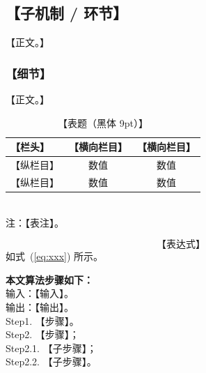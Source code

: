 \documentclass[twocolumn,10pt]{ctexart}
\let\songti\songfamily
\let\heiti\heifamily
\begin{document}
\subsection{\heiti\fontsize{10.5}{14}\selectfont 【子机制 / 环节】}
【正文。】

\subsubsection{\songti\fontsize{10}{13}\selectfont 【细节】}
【正文。】


\begin{table}[t]
\centering
\caption{【表题（黑体 9pt）】}
\label{tab:xxx}
\fontsize{8}{10}\selectfont
\begin{tabular}{lcc}
\toprule
【栏头】 & 【横向栏目】 & 【横向栏目】 \\
\midrule
【纵栏目】 & 数值 & 数值 \\
【纵栏目】 & 数值 & 数值 \\
\bottomrule
\end{tabular}\\[2pt]
\fontsize{8}{10}\selectfont 注：【表注】。
\end{table}

\begin{equation}
  【表达式】 \label{eq:xxx}
\end{equation}
如式~(\ref{eq:xxx}) 所示。

\textbf{本文算法步骤如下：}\\
输入：【输入】。\\
输出：【输出】。\\
Step1. 【步骤】。\\
Step2. 【步骤】；\\
\hspace{2em} Step2.1. 【子步骤】；\\
\hspace{2em} Step2.2. 【子步骤】。

\end{document}
